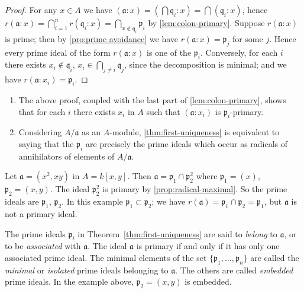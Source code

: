 \begin{proof}
    For any $x \in A$ we have $(\mathfrak{a} : x) = \left(\bigcap \mathfrak{q}_i : x\right) = \bigcap (\mathfrak{q}_i : x)$, hence $r(\mathfrak{a} : x) = \bigcap_{i=1}^n r(\mathfrak{q}_i : x) = \bigcap_{x \notin \mathfrak{q}_i} \mathfrak{p}_i$ by \eqref{lem:colon-primary}. Suppose $r(\mathfrak{a} : x)$ is prime; then by \eqref{pro:prime avoidance} we have $r(\mathfrak{a} : x) = \mathfrak{p}_j$ for some $j$. Hence every prime ideal of the form $r(\mathfrak{a} : x)$ is one of the $\mathfrak{p}_i$. Conversely, for each $i$ there exists $x_i \notin \mathfrak{q}_i$, $x_i \in \bigcap_{j \neq i} \mathfrak{q}_j$, since the decomposition is minimal; and we have $r(\mathfrak{a} : x_i) = \mathfrak{p}_i$.
\end{proof}
\begin{remarks}\label{rem:first-uniqueness}
    \begin{enumerate}[1)]
        \item The above proof, coupled with the last part of \eqref{lem:colon-primary}, shows that for each $i$ there exists $x_i$ in $A$ such that $(\mathfrak{a} : x_i)$ is $\mathfrak{p}_i$-primary.
        \item Considering $A/\mathfrak{a}$ as an $A$-module, \eqref{thm:first-uniqueness} is equivalent to saying that the $\mathfrak{p}_i$ are precisely the prime ideals which occur as radicals of annihilators of elements of $A/\mathfrak{a}$.
    \end{enumerate}
\end{remarks}

\begin{example}\label{ex:embedded-primes}
    Let $\mathfrak{a} = (x^2, xy)$ in $A = k[x, y]$. Then $\mathfrak{a} = \mathfrak{p}_1 \cap \mathfrak{p}_2^2$ where $\mathfrak{p}_1 = (x)$, $\mathfrak{p}_2 = (x, y)$. The ideal $\mathfrak{p}_2^2$ is primary by \eqref{prop:radical-maximal}. So the prime ideals are $\mathfrak{p}_1$, $\mathfrak{p}_2$. In this example $\mathfrak{p}_1 \subset \mathfrak{p}_2$; we have $r(\mathfrak{a}) = \mathfrak{p}_1 \cap \mathfrak{p}_2 = \mathfrak{p}_1$, but $\mathfrak{a}$ is not a primary ideal.
\end{example}

The prime ideals $\mathfrak{p}_i$ in Theorem~\ref{thm:first-uniqueness} are said to \emph{belong} to $\mathfrak{a}$, or to be \emph{associated} with $\mathfrak{a}$. The ideal $\mathfrak{a}$ is primary if and only if it has only one associated prime ideal. The minimal elements of the set $\{\mathfrak{p}_1, \ldots, \mathfrak{p}_n\}$ are called the \emph{minimal} or \emph{isolated} prime ideals belonging to $\mathfrak{a}$. The others are called \emph{embedded} prime ideals. In the example above, $\mathfrak{p}_2 = (x, y)$ is embedded.

